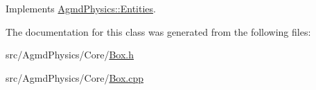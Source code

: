 Implements \hyperlink{class_agmd_physics_1_1_entities_af050c30f7d9d0f0d0c8c626b6bbf30d1}{Agmd\+Physics\+::\+Entities}.



The documentation for this class was generated from the following files\+:\begin{DoxyCompactItemize}
\item 
src/\+Agmd\+Physics/\+Core/\hyperlink{_box_8h}{Box.\+h}\item 
src/\+Agmd\+Physics/\+Core/\hyperlink{_box_8cpp}{Box.\+cpp}\end{DoxyCompactItemize}
